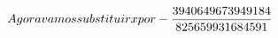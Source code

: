 \documentclass[preview]{standalone}
\begin{document}
\begin{align*}
\special{dvisvgm:raw <g id='unique000'>}Agora vamos substituir x por - \frac{3940649673949184}{825659931684591}\special{dvisvgm:raw </g>}
\end{align*}
\end{document}
